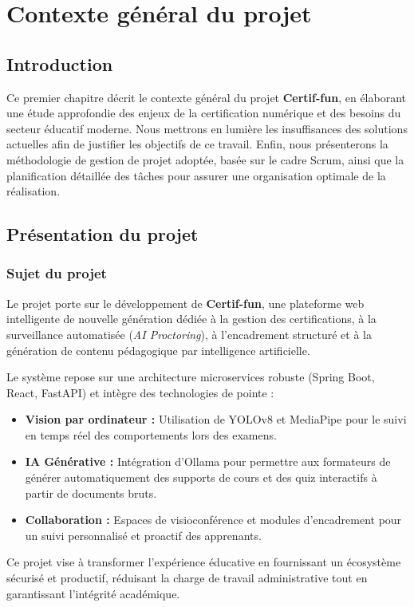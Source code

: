 \chapter{Contexte général du projet}

\section{Introduction}
Ce premier chapitre décrit le contexte général du projet \textbf{Certif-fun}, en élaborant une étude approfondie des enjeux de la certification numérique et des besoins du secteur éducatif moderne. Nous mettrons en lumière les insuffisances des solutions actuelles afin de justifier les objectifs de ce travail. Enfin, nous présenterons la méthodologie de gestion de projet adoptée, basée sur le cadre Scrum, ainsi que la planification détaillée des tâches pour assurer une organisation optimale de la réalisation.

\section{Présentation du projet}
\subsection{Sujet du projet}
Le projet porte sur le développement de \textbf{Certif-fun}, une plateforme web intelligente de nouvelle génération dédiée à la gestion des certifications, à la surveillance automatisée (\textit{AI Proctoring}), à l'encadrement structuré et à la génération de contenu pédagogique par intelligence artificielle. 

Le système repose sur une architecture microservices robuste (Spring Boot, React, FastAPI) et intègre des technologies de pointe : 
\begin{itemize}
    \item \textbf{Vision par ordinateur :} Utilisation de YOLOv8 et MediaPipe pour le suivi en temps réel des comportements lors des examens.
    \item \textbf{IA Générative :} Intégration d'Ollama pour permettre aux formateurs de générer automatiquement des supports de cours et des quiz interactifs à partir de documents bruts.
    \item \textbf{Collaboration :} Espaces de visioconférence et modules d'encadrement pour un suivi personnalisé et proactif des apprenants.
\end{itemize}

Ce projet vise à transformer l'expérience éducative en fournissant un écosystème sécurisé et productif, réduisant la charge de travail administrative tout en garantissant l'intégrité académique.

